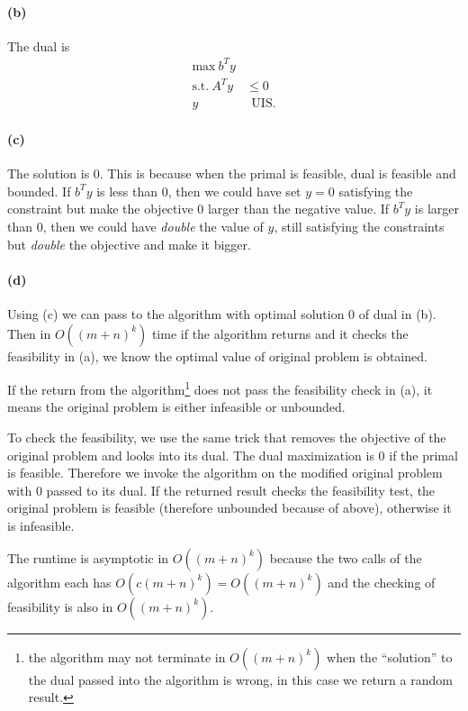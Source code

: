 \documentclass[12pt]{article}
\begin{document}
\paragraph{(b)}
The dual is 
\begin{align*}
\text{max} ~ b^Ty& \\
\text{s.t.} ~ A^Ty &\leq 0\\
y &~~\text{UIS}.
\end{align*}

\paragraph{(c)}
The solution is 0. This is because when the primal is feasible, dual is feasible and bounded. If $b^Ty$ is less than $0$, then we could have set $y=0$ satisfying the constraint but make the objective $0$ larger than the negative value. If $b^Ty$ is larger than $0$, then we could have \emph{double} the value of $y$, still satisfying the constraints but \emph{double} the objective and make it bigger. 

\paragraph{(d)}
Using (c) we can pass to the algorithm with optimal solution $0$ of dual in (b). Then in $O((m+n)^k)$ time if the algorithm returns and it checks the feasibility in (a), we know the optimal value of original problem is obtained. 

If the return from the algorithm\footnote{the algorithm may not terminate in $O((m+n)^k)$ when the ``solution'' to the dual passed into the algorithm is wrong, in this case we return a random result.} does not pass the feasibility check in (a), it means the original problem is either infeasible or unbounded. 

To check the feasibility, we use the same trick that removes the objective of the original problem and looks into its dual. The dual maximization is $0$ if the primal is feasible. Therefore we invoke the algorithm on the modified original problem with $0$ passed to its dual. If the returned result checks the feasibility test, the original problem is feasible (therefore unbounded because of above), otherwise it is infeasible.

The runtime is asymptotic in $O((m+n)^k)$ because the two calls of the algorithm each has $O(c(m+n)^k) = O((m+n)^k)$ and the checking of feasibility is also in $O((m+n)^k)$.
\end{document}
